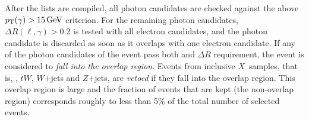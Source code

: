 %
After the lists are compiled, all photon candidates are checked against the above $\pT(\gamma) > \SI{15}{\GeV}$ criterion.
For the remaining photon candidates, $\Delta R(\ell,\gamma) > 0.2$ is tested with all electron candidates, and the photon candidate is discarded as soon as it overlaps with one electron candidate.
If any of the photon candidates of the event pass both \pT and $\Delta R$ requirement, the event is considered to \emph{fall into the overlap region}.
Events from inclusive $X$~samples, that is, \ttbar, $tW$, $W$+jets and $Z$+jets, are \emph{vetoed} if they fall into the overlap region. This overlap region is large and the fraction of events that are kept (the non-overlap region) corresponds roughly to less than 5\% of the total number of selected events.%




